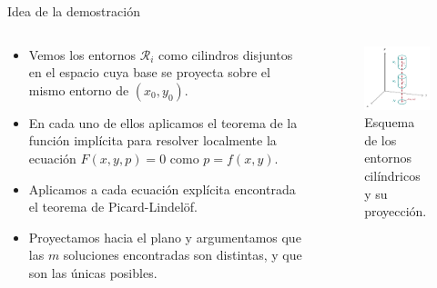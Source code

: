 \documentclass[10pt, spanish]{beamer}
\begin{document}
\begin{frame}{Idea de la demostración}

\begin{columns}[T]
\begin{column}{.48\textwidth}

\hspace{0pt}
\vspace{20mm}
\begin{itemize}
  \item<only@1> Vemos los entornos $\mathcal R_i$ como cilindros disjuntos en el espacio cuya base se proyecta sobre el mismo entorno de $(x_0, y_0)$.
  \item<only@2> En cada uno de ellos aplicamos el teorema de la función implícita para resolver localmente la ecuación $F(x,y,p)=0$ como $p=f(x,y)$.
  \item<only@3> Aplicamos a cada ecuación explícita encontrada el teorema de Picard-Lindelöf.
  \item<only@4> Proyectamos hacia el plano y argumentamos que las $m$ soluciones encontradas son distintas, y que son las únicas posibles.
\end{itemize}
\vfill
\hspace{0pt}
\end{column}%
\hfill%
\begin{column}{.48\textwidth}

\begin{figure}
	\centering
	\includegraphics[width=\textwidth]{../figures/cylinder.pdf}
	\caption{\footnotesize Esquema de los entornos cilíndricos y su proyección.}
\end{figure}
\end{column}%
\end{columns}
\end{frame}
\end{document}
